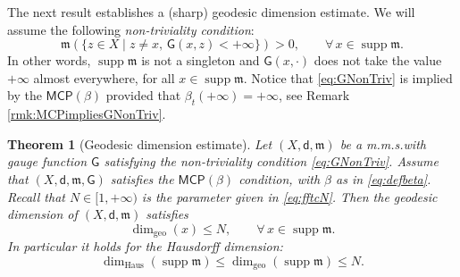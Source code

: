 \documentclass[11pt,a4paper]{article}
\theoremstyle{plain}
\newtheorem{theorem}{Theorem}[section]
\theoremstyle{definition}
\theoremstyle{remark}
\numberwithin{equation}{section}
\DeclareMathOperator{\supp}{\mathrm{supp}}
\newcommand{\MCP}{\mathsf{MCP}}
\newcommand{\mm}{\mathfrak m}
\newcommand{\sfd}{\mathsf d}
\newcommand{\sfG}{\mathsf G}
\newcommand{\NN}{\dim_{\mathrm{geo}}}
\newcommand{\NH}{\dim_{\mathrm{Haus}}}
\begin{document}
The next result establishes a (sharp) geodesic dimension estimate. We will assume the following \emph{non-triviality condition}:
\begin{equation}\label{eq:GNonTriv}
\mm(\{z\in X\mid z\neq x, \,  \sfG(x, z)<+\infty\})>0, \qquad \forall\, x\in   \supp\mm.
\end{equation}
In other words, $\supp\mm$ is not a singleton and $\sfG(x,\cdot)$ does not take the value $+\infty$ almost everywhere, for all $x\in \supp\mm$. Notice that \eqref{eq:GNonTriv} is implied by the $\MCP(\beta)$ provided that $\beta_t(+\infty) = +\infty$, see Remark \ref{rmk:MCPimpliesGNonTriv}.


\begin{theorem}[Geodesic dimension estimate]\label{thm:GeodDimEst}
Let $(X,\sfd,\mm)$ be a m.m.s.\@ with gauge function $\sfG$ satisfying the non-triviality condition \eqref{eq:GNonTriv}. Assume that $(X,\sfd,\mm, \sfG)$ satisfies the $\MCP(\beta)$ condition, with $\beta$ as in \eqref{eq:defbeta}. Recall that $N \in [1,+\infty)$ is the parameter given in \eqref{eq:fftcN}. Then the geodesic dimension of $(X,\sfd,\mm)$ satisfies
\begin{equation}\label{eq:estimate-geod}
\NN(x) \leq N, \qquad \forall\, x\in \supp\mm.
\end{equation}
In particular it holds for the Hausdorff dimension:
\begin{equation}\label{eq:estimate-haus}
\NH(\supp \mm) \leq  \NN(\supp\mm) \leq N.
\end{equation}
\end{theorem}
\end{document}
